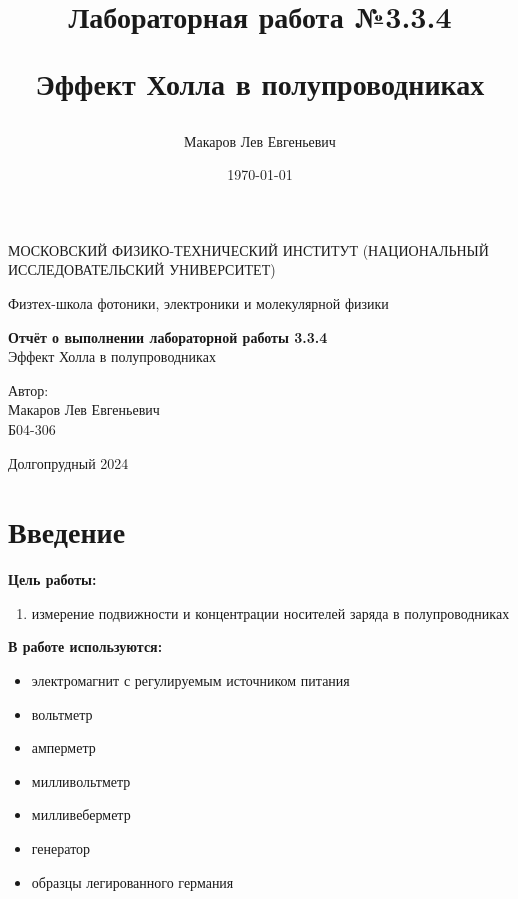 \documentclass[a4paper,12pt]{article}
\author{Макаров Лев Евгеньевич}
\title{Лабораторная работа №3.3.4

Эффект Холла в полупроводниках
}
\date{\today}
\begin{document}
\begin{titlepage}
	\begin{center}
		{\large МОСКОВСКИЙ ФИЗИКО-ТЕХНИЧЕСКИЙ ИНСТИТУТ (НАЦИОНАЛЬНЫЙ ИССЛЕДОВАТЕЛЬСКИЙ УНИВЕРСИТЕТ)}
	\end{center}
	\begin{center}
		{\large Физтех-школа фотоники, электроники и молекулярной физики}
	\end{center}
	
	
	\vspace{4.5cm}
	{\huge
		\begin{center}
			{\bf Отчёт о выполнении лабораторной работы 3.3.4}\\
			Эффект Холла в полупроводниках
		\end{center}
	}
	\vspace{2cm}
	\begin{flushright}
		{\LARGE Автор:\\ Макаров Лев Евгеньевич \\
			\vspace{0.2cm}
			Б04-306}
	\end{flushright}
	\vspace{8cm}
	\begin{center}
		Долгопрудный 2024
	\end{center}
\end{titlepage}

\section{Введение}

\textbf{Цель работы:} 
\begin{enumerate}
	\item измерение подвижности и концентрации носителей заряда в полупроводниках
\end{enumerate}

\textbf{В работе используются:} 
\begin{itemize}
    \item электромагнит с регулируемым источником питания
    \item вольтметр
    \item амперметр
    \item милливольтметр
    \item милливеберметр
    \item генератор
    \item образцы легированного германия
\end{itemize}
\medskip
\end{document}
